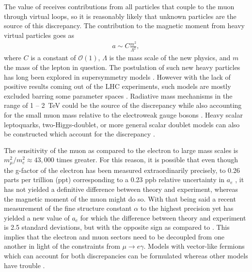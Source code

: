 The value of \amu receives contributions from all particles that couple to the muon through virtual loops, so it is reasonably likely that unknown particles are the source of this discrepancy. The contribution to the magnetic moment from heavy virtual particles goes as 
		\begin{align}
            a \sim C \frac{m^{2}}{\Lambda^{2}},
		\end{align}
where $C$ is a constant of $\mathcal{O}(1)$, $\Lambda$ is the mass scale of the new physics, and $m$ the mass of the lepton in question. The postulation of such new heavy particles has long been explored in supersymmetry models \cite{Czarnecki_2001}. However with the lack of positive results coming out of the LHC experiments, such models are mostly excluded barring some parameter spaces \cite{Hagiwara_2018}. Radiative mass mechanisms in the range of 1 -- \SI{2}{\TeV} could be the source of the discrepancy while also accounting for the small muon mass relative to the electroweak gauge bosons \cite{Czarnecki_2001}. Heavy scalar leptoquarks, two-Higgs-doublet, or more general scalar doublet models can also be constructed which account for the discrepancy \cite{Leskow_2017,crivellin2019bto,Abe_2019}.



The sensitivity of the muon as compared to the electron to large mass scales is $ m_{\mu}^{2} / m_{e}^{2} \approx 43,000$ times greater. For this reason, it is possible that even though the g-factor of the electron has been measured extraordinarily precisely, to 0.26 parts per trillion (ppt) corresponding to a 0.23 ppb relative uncertainty in $a_{e}$ \cite{CODATA,ElectronMDM}, it has not yielded a definitive difference between theory and experiment, whereas the magnetic moment of the muon might do so. With that being said a recent measurement of the fine structure constant $\alpha$ to the highest precision yet \cite{finestructureBerkeley} has yielded a new value of $a_{e}$ for which the difference between theory and experiment is 2.5 standard deviations, but with the opposite sign as compared to \amu. This implies that the electron and muon sectors need to be decoupled from one another in light of the constraints from $\mu \rightarrow e\gamma$. Models with vector-like fermions which can account for both discrepancies can be formulated whereas other models have trouble \cite{PhysRevD.98.113002}.



